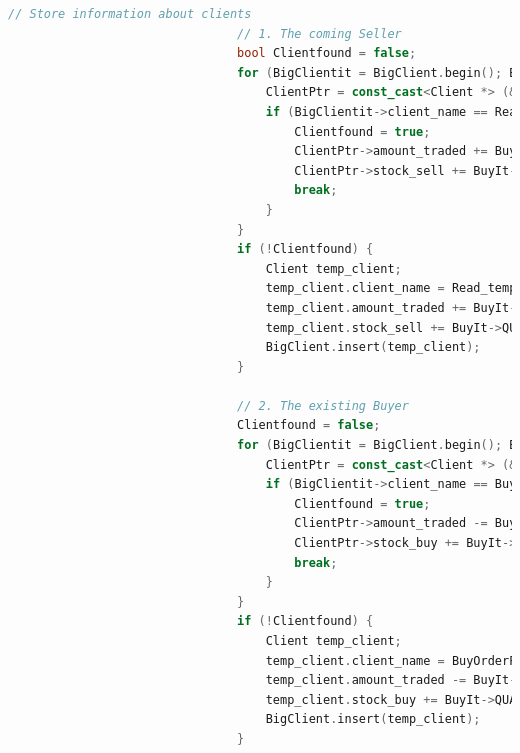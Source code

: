\documentclass{article}
\begin{document}
\begin{lstlisting}[language=C++]
                                // Store information about clients
                                // 1. The coming Seller
                                bool Clientfound = false;
                                for (BigClientit = BigClient.begin(); BigClientit != BigClient.end(); BigClientit++) {
                                    ClientPtr = const_cast<Client *> (&(*BigClientit));
                                    if (BigClientit->client_name == Read_temp.CLIENT_NAME) {
                                        Clientfound = true;
                                        ClientPtr->amount_traded += BuyIt->QUANTITY * BuyIt->PRICE;
                                        ClientPtr->stock_sell += BuyIt->QUANTITY;
                                        break;
                                    }
                                }
                                if (!Clientfound) {
                                    Client temp_client;
                                    temp_client.client_name = Read_temp.CLIENT_NAME;
                                    temp_client.amount_traded += BuyIt->QUANTITY * BuyIt->PRICE;
                                    temp_client.stock_sell += BuyIt->QUANTITY;
                                    BigClient.insert(temp_client);
                                }

                                // 2. The existing Buyer
                                Clientfound = false;
                                for (BigClientit = BigClient.begin(); BigClientit != BigClient.end(); BigClientit++) {
                                    ClientPtr = const_cast<Client *> (&(*BigClientit));
                                    if (BigClientit->client_name == BuyOrderPtr->CLIENT_NAME) {
                                        Clientfound = true;
                                        ClientPtr->amount_traded -= BuyIt->QUANTITY * BuyIt->PRICE; // wrong sign
                                        ClientPtr->stock_buy += BuyIt->QUANTITY;
                                        break;
                                    }
                                }
                                if (!Clientfound) {
                                    Client temp_client;
                                    temp_client.client_name = BuyOrderPtr->CLIENT_NAME;
                                    temp_client.amount_traded -= BuyIt->QUANTITY * BuyIt->PRICE;
                                    temp_client.stock_buy += BuyIt->QUANTITY;
                                    BigClient.insert(temp_client);
                                }



\end{lstlisting}
\end{document}
